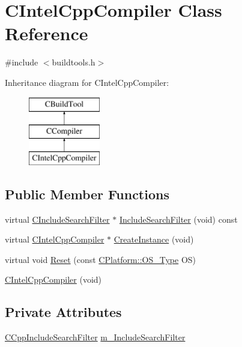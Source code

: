 \hypertarget{classCIntelCppCompiler}{\section{C\-Intel\-Cpp\-Compiler Class Reference}
\label{classCIntelCppCompiler}
}


{\ttfamily \#include $<$buildtools.\-h$>$}

Inheritance diagram for C\-Intel\-Cpp\-Compiler\-:\begin{figure}[H]
\begin{center}
\leavevmode
\includegraphics[height=3.000000cm]{dd/da0/classCIntelCppCompiler}
\end{center}
\end{figure}
\subsection*{Public Member Functions}
\begin{DoxyCompactItemize}
\item 
virtual \hyperlink{classCIncludeSearchFilter}{C\-Include\-Search\-Filter} $\ast$ \hyperlink{classCIntelCppCompiler_a7937ce18c293da16161f14e51d873b5a}{Include\-Search\-Filter} (void) const 
\item 
virtual \hyperlink{classCIntelCppCompiler}{C\-Intel\-Cpp\-Compiler} $\ast$ \hyperlink{classCIntelCppCompiler_a2e75b0ac5a7860128f25f29698f51509}{Create\-Instance} (void)
\item 
virtual void \hyperlink{classCIntelCppCompiler_a39338f5aead731a4fc834605d2d60c37}{Reset} (const \hyperlink{classCPlatform_a2fb735c63c53052f79629e338bb0f535}{C\-Platform\-::\-O\-S\-\_\-\-Type} O\-S)
\item 
\hyperlink{classCIntelCppCompiler_aa1a3357afdec8931fc7e17ebc317a1e6}{C\-Intel\-Cpp\-Compiler} (void)
\end{DoxyCompactItemize}
\subsection*{Private Attributes}
\begin{DoxyCompactItemize}
\item 
\hyperlink{classCCppIncludeSearchFilter}{C\-Cpp\-Include\-Search\-Filter} \hyperlink{classCIntelCppCompiler_a3d70f7d935b38d79cec20db5f387071f}{m\-\_\-\-Include\-Search\-Filter}
\end{DoxyCompactItemize}
